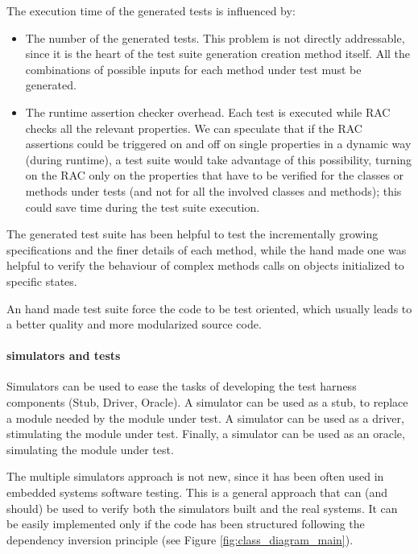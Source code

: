 \documentclass[english]{lni}
\begin{document}
The execution time of the generated tests is influenced by:
\begin{itemize}
\item The number of the generated tests. 
This problem is not directly addressable, since it is the heart of the test suite generation creation method itself. 
All the combinations of possible inputs for each method under test must be generated.
\item The runtime assertion checker overhead. 
Each test is executed while RAC checks all the relevant properties. 
We can speculate that if the RAC assertions could be triggered on and off on single properties in a dynamic way (during runtime), a test suite would take advantage of this possibility, turning on the RAC only on the properties that have to be verified for the classes or methods under tests (and not for all the involved classes and methods); this could save time during the test suite execution.
\end{itemize}

The generated test suite has been helpful to test the incrementally growing specifications and the finer details of each method, while the hand made one was helpful to verify the behaviour of complex methods calls on objects initialized to specific states. 

An hand made test suite force the code to be test oriented, which usually leads to a better quality and more modularized source code\cite{Binder1999}.

\paragraph*{simulators and tests}

Simulators can be used to ease the tasks of developing the test harness components (Stub, Driver, Oracle).
A simulator can be used as a stub, to replace a module needed by the module under test.
A simulator can be used as a driver, stimulating the module under test.
Finally, a simulator can be used as an oracle, simulating the module under test.

The multiple simulators approach is not new, since it has been often used in embedded systems software testing\cite{Broekman2002}.  
This is a general approach that can (and should) be used to verify both the simulators built and the real systems.  
It can be easily implemented only if the code has been structured following the dependency inversion principle\cite{Martin1996} (see Figure
\ref{fig:class_diagram_main}).
\end{document}

